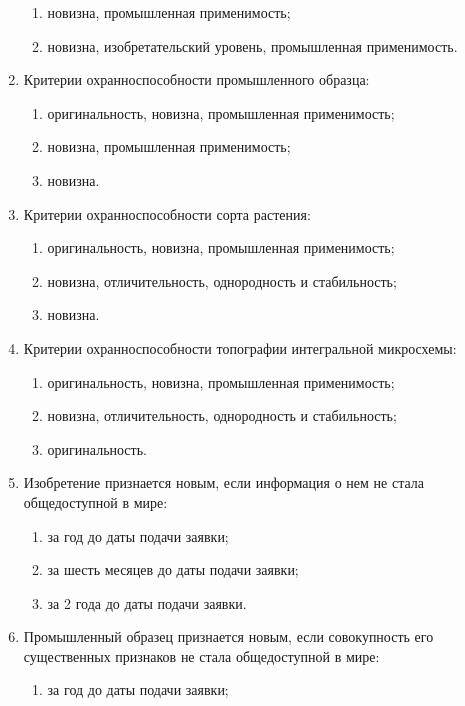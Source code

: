 \begin{enumerate}
\begin{enumerate}
        \item \cmark новизна, промышленная применимость;
        \item новизна, изобретательский уровень, промышленная применимость.
    \end{enumerate}
    \item Критерии охранноспособности промышленного образца:
    \begin{enumerate}
        \item оригинальность, новизна, промышленная применимость;
        \item новизна, промышленная применимость;
        \item \cmark новизна.
    \end{enumerate}
    \item Критерии охранноспособности сорта растения:
    \begin{enumerate}
        \item оригинальность, новизна, промышленная применимость;
        \item \cmark новизна, отличительность, однородность и стабильность;
        \item новизна.
    \end{enumerate}
    \item Критерии охранноспособности топографии интегральной микросхемы:
    \begin{enumerate}
        \item оригинальность, новизна, промышленная применимость;
        \item новизна, отличительность, однородность и стабильность;
        \item \cmark оригинальность.
    \end{enumerate}
    \item Изобретение  признается новым, если информация о нем  не стала общедоступной в мире:
    \begin{enumerate}
        \item \cmark за год до даты подачи заявки; 
        \item за шесть месяцев до даты подачи заявки;
        \item за 2 года до даты подачи заявки.
    \end{enumerate}
    \item Промышленный образец признается новым, если совокупность его существенных признаков не стала общедоступной в мире:
    \begin{enumerate}
        \item \cmark за год до даты подачи заявки; 

\end{enumerate}
\end{enumerate}
